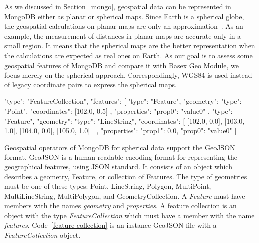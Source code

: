 \documentclass[a4paper,12pt]{article}
\begin{document}
As we discussed in Section~\ref{mongo}, geospatial data can be represented in MongoDB either as planar or spherical maps. Since Earth is a spherical globe, the geospatial calculations on planar maps are only an approximation~\cite{coordsys,coordsys-mongo}. As an example, the measurement of distances in planar maps are accurate only in a small region. It means that the spherical maps are the better representation when the calculations are expected as real ones on Earth. As our goal is to assess some geospatial features of MongoDB and compare it with Basex Geo Module, we focus merely on the spherical approach. Correspondingly, WGS84 is used instead of legacy coordinate pairs to express the spherical maps. 

\vspace{10px}
\begin{fakeXML}[label=feature-collection,caption=A GeoJSON file containing a \textit{FeatureCollection} object]
{
  "type": "FeatureCollection",
  "features": [
    {
      "type": "Feature",
      "geometry": {
        "type": "Point",
        "coordinates": [102.0, 0.5]
      },
      "properties": {
        "prop0": "value0"
      }
    },
    {
      "type": "Feature",
      "geometry": {
        "type": "LineString",
        "coordinates": [
          [102.0, 0.0], [103.0, 1.0], [104.0, 0.0], [105.0, 1.0]
        ]
      },
      "properties": {
        "prop1": 0.0,
        "prop0": "value0"
      }
    }
  ]
}
\end{fakeXML}
\vspace{10px}


Geospatial operators of MongoDB for spherical data support the GeoJSON \cite{www/geojson} format. GeoJSON is a human-readable encoding format for representing the geographical features, using JSON standard. It consists of an object which describes a geometry, Feature, or collection of Features. The type of geometries must be one of these types: Point, LineString, Polygon, MultiPoint, MultiLineString, MultiPolygon, and GeometryCollection. A \textit{Feature} must have members with the names \textit{geometry} and \textit{properties}. A feature collection is an object with the type \textit{FeatureCollection} which must have a member with the name \textit{features}. Code~\ref{feature-collection} is an instance GeoJSON file with a \textit{FeatureCollection} object.
\end{document}
